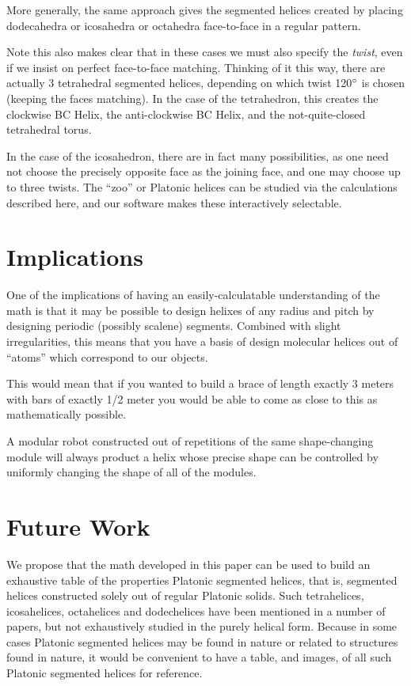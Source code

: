 \documentclass[11pt]{article}
\begin{document}
{More generally, the same approach gives the segmented helices
created by placing dodecahedra or icosahedra or octahedra face-to-face
in a regular pattern.

Note this also makes clear that in these cases we must also specify the {\em twist},
even if we insist on perfect face-to-face matching. Thinking of it this
way, there are actually 3 tetrahedral segmented helices, depending on which twist 120$\degree$
is chosen (keeping the faces matching). In the case of the tetrahedron,
this creates the clockwise BC Helix, the anti-clockwise BC Helix, and the
not-quite-closed tetrahedral torus.

In the case of the icosahedron, there are in fact many possibilities,
as one need not choose the precisely opposite face as the joining face, and
one may choose up to three twists. The ``zoo'' or Platonic helices
can be studied via the calculations described here, and our software
makes these interactively selectable.

\section{Implications}

One of the implications of having an easily-calculatable understanding of the math
is that it may be possible to design helixes
of any radius and pitch by designing periodic (possibly scalene) segments. Combined with slight
irregularities, this means that you have a basis of design molecular helices
out of ``atoms'' which correspond to our objects.

This would mean that if you wanted to build a brace of length exactly 3 meters
with bars of exactly 1/2 meter you would be able to come as close to this
as mathematically possible.

A modular robot constructed out of repetitions of the same shape-changing module will always product a helix
whose precise shape can be controlled by uniformly changing the shape of all of the modules.

\section{Future Work}

We propose that the math developed in this paper can be used to build an exhaustive table of the properties {Platonic segmented helices},
that is, segmented helices constructed solely out of regular Platonic solids. Such tetrahelices, icosahelices, octahelices and dodechelices
have been mentioned in a number of papers\cite{elgersma2016quadrahelix,babiker2012combinatorial,lord2001sphere}, but not exhaustively studied in the purely helical form. Because in some cases Platonic segmented helices may be found in nature or related to structures found in nature\cite{lord2004gamma,pearce1990structure},
it would be convenient to have a table, and images, of all such Platonic segmented helices for reference.

}
\end{document}
